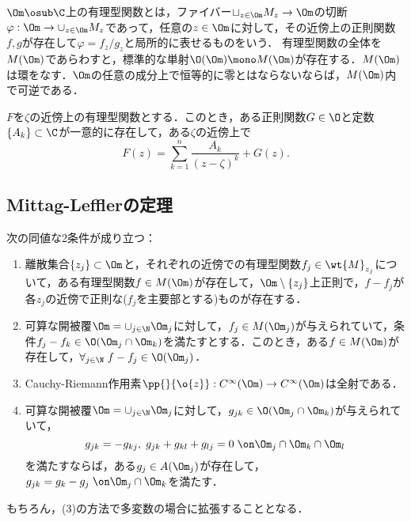 \documentclass[uplatex, dvipdfmx]{jsreport}
\begin{document}
\begin{definition}
    $\Om\osub\C$上の有理型関数とは，ファイバー$\sqcup_{z\in\Om}M_z\to\Om$の切断$\varphi:\Om\to\cup_{z\in\Om}M_z$であって，任意の$z\in\Om$に対して，その近傍上の正則関数$f,g$が存在して$\varphi=f_z/g_z$と局所的に表せるものをいう．
    有理型関数の全体を$M(\Om)$であらわすと，標準的な単射$\O(\Om)\mono M(\Om)$が存在する．$M(\Om)$は環をなす．$\Om$の任意の成分上で恒等的に零とはならないならば，$M(\Om)$内で可逆である．
\end{definition}

\begin{theorem}
    $F$を$\zeta$の近傍上の有理型関数とする．このとき，ある正則関数$G\in\O$と定数$\{A_k\}\subset\C$が一意的に存在して，ある$\zeta$の近傍上で
    \[F(z)=\sum^n_{k=1}\frac{A_k}{(z-\zeta)^k}+G(z).\]
\end{theorem}

\subsection{Mittag-Lefflerの定理}

\begin{theorem}
    次の同値な2条件が成り立つ：
    \begin{enumerate}
        \item 離散集合$\{z_j\}\subset\Om$と，それぞれの近傍での有理型関数$f_j\in\wt{M}_{z_j}$について，ある有理型関数$f\in M(\Om)$が存在して，$\Om\setminus\{z_j\}$上正則で，$f-f_j$が各$z_j$の近傍で正則な($f_j$を主要部とする)ものが存在する．
        \item 可算な開被覆$\Om=\cup_{j\in\N}\Om_j$に対して，$f_j\in M(\Om_j)$が与えられていて，条件$f_j-f_k\in\O(\Om_j\cap\Om_k)$を満たすとする．このとき，ある$f\in M(\Om)$が存在して，$\forall_{j\in\N}\;f-f_j\in\O(\Om_j)$．
        \item Cauchy-Riemann作用素$\pp{}{\o{z}}:C^\infty(\Om)\to C^\infty(\Om)$は全射である．
        \item 可算な開被覆$\Om=\cup_{j\in\N}\Om_j$に対して，$g_{jk}\in\O(\Om_j\cap\Om_k)$が与えられていて，
        \[g_{jk}=-g_{kj},\; g_{jk}+g_{kl}+g_{lj}=0\;\on\Om_j\cap\Om_k\cap\Om_l\]
        を満たすならば，ある$g_j\in A(\Om_j)$が存在して，$g_{jk}=g_k-g_j\;\on\Om_j\cap\Om_k$を満たす．
    \end{enumerate}
\end{theorem}
\begin{remarks}
    もちろん，(3)の方法で多変数の場合に拡張することとなる．
\end{remarks}
\end{document}
